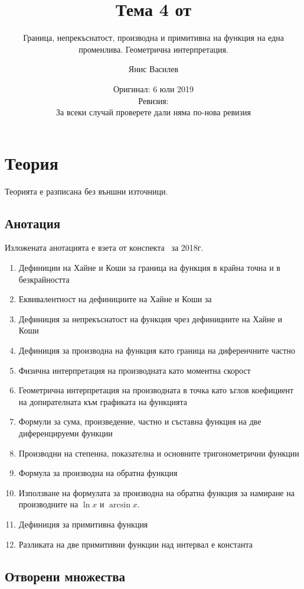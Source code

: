\documentclass[numbers=endperiod, bibliography=totocnumbered]{scrartcl}
\title{Тема 4 от \URL{https://github.com/v--/se2018}}
\subtitle{Граница, непрекъснатост, производна и примитивна на функция на една променлива. Геометрична интерпретация.}
\author{Янис Василев}
\date{Оригинал: 6 юли 2019 \\ Ревизия:  \\ За всеки случай проверете дали няма по-нова ревизия}
\begin{document}
\maketitle

\section{Теория}

Теорията е разписана без външни източници.

\subsection{Анотация}

Изложената анотацията е взета от конспекта~\cite{Syllabus} за 2018г.

\begin{enumerate}
  \item Дефиниции на Хайне и Коши за граница на функция в крайна точна и в безкрайността
  \item Еквивалентност на дефинициите на Хайне и Коши за
  \item Дефиниция за непрекъснатост на функция чрез дефинициите на Хайне и Коши
  \item Дефиниция за производна на функция като граница на диференчните частно
  \item Физична интерпретация на производната като моментна скорост
  \item Геометрична интерпретация на производната в точка като ъглов коефициент на допирателната към графиката на функцията
  \item Формули за сума, произведение, частно и съставна функция на две диференцируеми функции
  \item Производни на степенна, показателна и основните тригонометрични функции
  \item Формула за производна на обратна функция
  \item Използване на формулата за производна на обратна функция за намиране на производните на \( \ln x \) и \( \arcsin x \).
  \item Дефиниция за примитивна функция
  \item Разликата на две примитивни функции над интервал е константа
\end{enumerate}

\subsection{Отворени множества}
\end{document}
